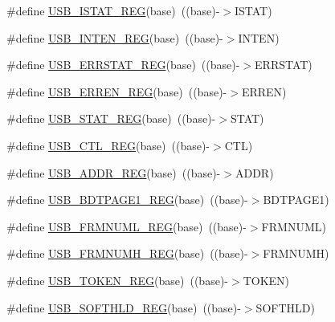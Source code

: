 \begin{DoxyCompactItemize}
\#define \hyperlink{group___u_s_b___register___accessor___macros_ga0f24e60354c45e02ee9702596e4a5878}{U\+S\+B\+\_\+\+I\+S\+T\+A\+T\+\_\+\+R\+EG}(base)~((base)-\/$>$I\+S\+T\+AT)
\item 
\#define \hyperlink{group___u_s_b___register___accessor___macros_ga8edd1b1424a6e18f6fe2cd1cbfb886ba}{U\+S\+B\+\_\+\+I\+N\+T\+E\+N\+\_\+\+R\+EG}(base)~((base)-\/$>$I\+N\+T\+EN)
\item 
\#define \hyperlink{group___u_s_b___register___accessor___macros_ga5dcfe1e668621d53983d793d1a2f8abd}{U\+S\+B\+\_\+\+E\+R\+R\+S\+T\+A\+T\+\_\+\+R\+EG}(base)~((base)-\/$>$E\+R\+R\+S\+T\+AT)
\item 
\#define \hyperlink{group___u_s_b___register___accessor___macros_ga8128051a5240f8bc046e31d405c67947}{U\+S\+B\+\_\+\+E\+R\+R\+E\+N\+\_\+\+R\+EG}(base)~((base)-\/$>$E\+R\+R\+EN)
\item 
\#define \hyperlink{group___u_s_b___register___accessor___macros_ga7c8ccd47cc8588700bdbd358f4c8e33f}{U\+S\+B\+\_\+\+S\+T\+A\+T\+\_\+\+R\+EG}(base)~((base)-\/$>$S\+T\+AT)
\item 
\#define \hyperlink{group___u_s_b___register___accessor___macros_gaf84a262dc6242d1a0f3b47186de660e7}{U\+S\+B\+\_\+\+C\+T\+L\+\_\+\+R\+EG}(base)~((base)-\/$>$C\+TL)
\item 
\#define \hyperlink{group___u_s_b___register___accessor___macros_ga325912e3ba69a2bd9e7d7a8c1708f8d5}{U\+S\+B\+\_\+\+A\+D\+D\+R\+\_\+\+R\+EG}(base)~((base)-\/$>$A\+D\+DR)
\item 
\#define \hyperlink{group___u_s_b___register___accessor___macros_gaceabcb5760b3521c323a2a274d692357}{U\+S\+B\+\_\+\+B\+D\+T\+P\+A\+G\+E1\+\_\+\+R\+EG}(base)~((base)-\/$>$B\+D\+T\+P\+A\+G\+E1)
\item 
\#define \hyperlink{group___u_s_b___register___accessor___macros_ga165dc318202eb67407c845711a774a38}{U\+S\+B\+\_\+\+F\+R\+M\+N\+U\+M\+L\+\_\+\+R\+EG}(base)~((base)-\/$>$F\+R\+M\+N\+U\+ML)
\item 
\#define \hyperlink{group___u_s_b___register___accessor___macros_gaa74a86752b5b1c0effc265f2bc9751da}{U\+S\+B\+\_\+\+F\+R\+M\+N\+U\+M\+H\+\_\+\+R\+EG}(base)~((base)-\/$>$F\+R\+M\+N\+U\+MH)
\item 
\#define \hyperlink{group___u_s_b___register___accessor___macros_ga14b16a54d217cc3564ff273a9da5120b}{U\+S\+B\+\_\+\+T\+O\+K\+E\+N\+\_\+\+R\+EG}(base)~((base)-\/$>$T\+O\+K\+EN)
\item 
\#define \hyperlink{group___u_s_b___register___accessor___macros_ga93a35e99748245a1eb946023333f7c2a}{U\+S\+B\+\_\+\+S\+O\+F\+T\+H\+L\+D\+\_\+\+R\+EG}(base)~((base)-\/$>$S\+O\+F\+T\+H\+LD)

\end{DoxyCompactItemize}
